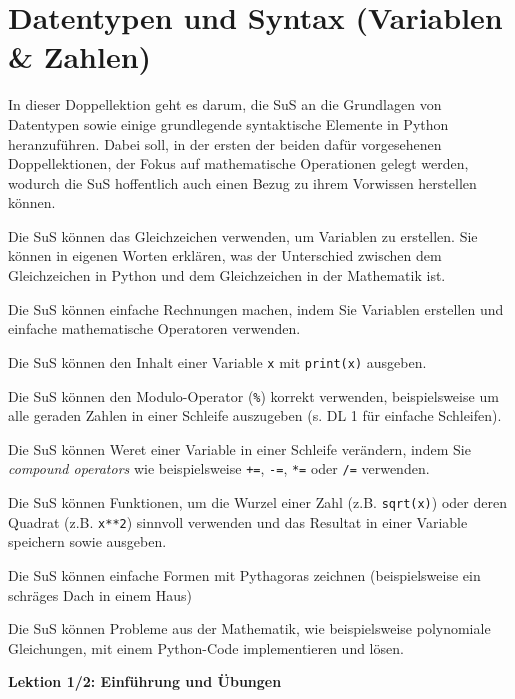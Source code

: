 \section{Datentypen und Syntax (Variablen \& Zahlen)}
\begin{myExBox}
In dieser Doppellektion geht es darum, die SuS an die Grundlagen von Datentypen sowie einige grundlegende syntaktische Elemente in Python heranzuführen. Dabei soll, in der ersten der beiden dafür vorgesehenen Doppellektionen, der Fokus auf mathematische Operationen gelegt werden, wodurch die SuS hoffentlich auch einen Bezug zu ihrem Vorwissen herstellen können.

\begin{todolist}
    \item Die SuS können das Gleichzeichen verwenden, um Variablen zu erstellen. Sie können in eigenen Worten erklären, was der Unterschied zwischen dem Gleichzeichen in Python und dem Gleichzeichen in der Mathematik ist.
    \item Die SuS können einfache Rechnungen machen, indem Sie Variablen erstellen und einfache mathematische Operatoren verwenden.
    \item Die SuS können den Inhalt einer Variable \lstinline|x| mit \lstinline|print(x)| ausgeben.
    \item Die SuS können den Modulo-Operator (\texttt{\%}) korrekt verwenden, beispielsweise um alle geraden Zahlen in einer Schleife auszugeben  (s. DL 1 für einfache Schleifen).
    \item Die SuS können Weret einer Variable in einer Schleife verändern, indem Sie \textit{compound operators} wie beispielsweise \lstinline|+=|, \lstinline|-=|, \lstinline|*=| oder \lstinline|/=| verwenden.
    \item Die SuS können Funktionen, um die Wurzel einer Zahl (z.B. \lstinline|sqrt(x)|) oder deren Quadrat (z.B. \lstinline|x**2|) sinnvoll verwenden und das Resultat in einer Variable speichern sowie ausgeben.
    \item Die SuS können einfache Formen mit Pythagoras zeichnen (beispielsweise ein schräges Dach in einem Haus)
    \item Die SuS können Probleme aus der Mathematik, wie beispielsweise polynomiale Gleichungen, mit einem Python-Code implementieren und lösen.
\end{todolist}

\textbf{Lektion 1/2: Einführung und Übungen}


\end{myExBox}
